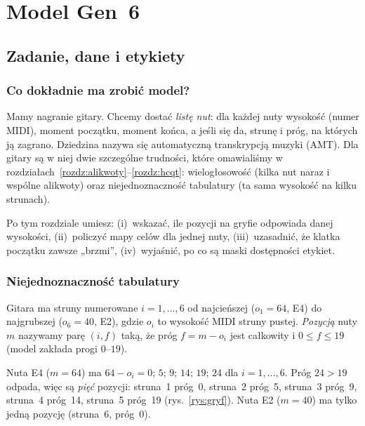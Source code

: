\part{Model Gen~6}

\chapter{Zadanie, dane i etykiety}\label{rozdz:dane}

\section{Co dokładnie ma zrobić model?}

Mamy nagranie gitary. Chcemy dostać \emph{listę nut}: dla każdej nuty wysokość (numer MIDI), moment początku, moment końca, a jeśli się da, strunę i próg, na których ją zagrano.
Dziedzina nazywa się automatyczną transkrypcją muzyki (AMT). Dla gitary są w niej dwie szczególne trudności, które omawialiśmy w rozdziałach~\ref{rozdz:alikwoty}--\ref{rozdz:hcqt}:
wielogłosowość (kilka nut naraz i wspólne alikwoty) oraz niejednoznaczność tabulatury (ta sama wysokość na kilku strunach).

Po tym rozdziale umiesz: (i)~wskazać, ile pozycji na gryfie odpowiada danej wysokości, (ii)~policzyć mapy celów dla jednej nuty, (iii)~uzasadnić, że klatka początku zawsze „brzmi”, (iv)~wyjaśnić, po co są maski dostępności etykiet.

\section{Niejednoznaczność tabulatury}

\begin{definicja}\label{def:pozycja}
Gitara ma struny numerowane $i=1,\dots,6$ od najcieńszej ($o_1=64$, E4) do najgrubszej ($o_6=40$, E2), gdzie $o_i$ to wysokość MIDI struny pustej.
\emph{Pozycją} nuty $m$ nazywamy parę $(i,f)$ taką, że próg $f=m-o_i$ jest całkowity i $0\le f\le19$ (model zakłada progi $0$--$19$).
\end{definicja}

\begin{przyklad}\label{prz:pozycje-e4}
Nuta E4 ($m=64$) ma $64-o_i=0;\,5;\,9;\,14;\,19;\,24$ dla $i=1,\dots,6$. Próg $24>19$ odpada, więc są \emph{pięć} pozycji: struna~1 próg~0, struna~2 próg~5, struna~3 próg~9, struna~4 próg~14, struna~5 próg~19
(rys.~\ref{rys:gryf}). Nuta E2 ($m=40$) ma tylko jedną pozycję (struna~6, próg~0).
\end{przyklad}

